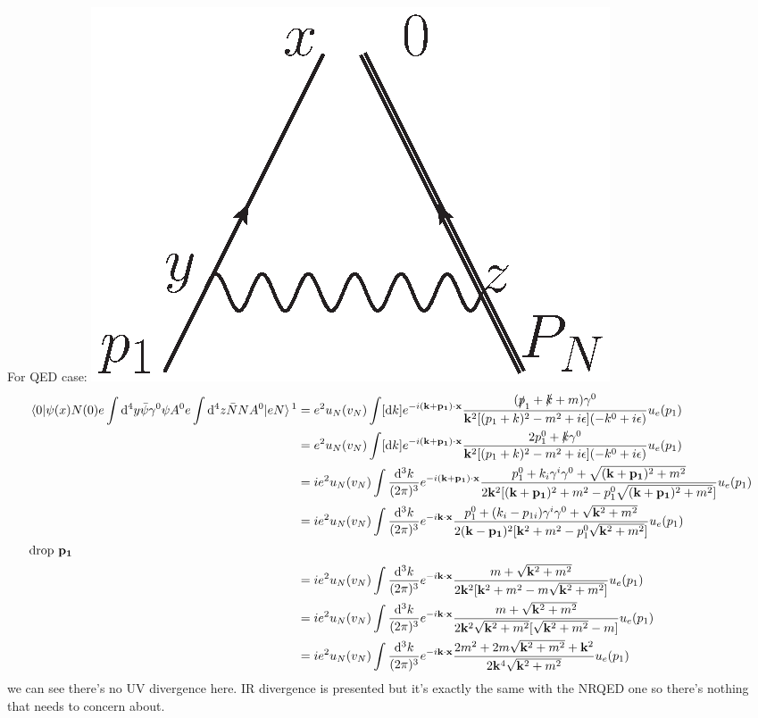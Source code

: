 \documentclass{article}
\newcommand{\g}{\gamma}
\begin{document}
For QED case:
\includegraphics[width=1.2 in]{OPE-2.eps}
\begin{align*}
  \mel{0}{\psi(x)N(0)e\int\dd^4y\bar\psi\g^0\psi A^0 e\int\dd^4 z \bar N NA^0}{eN}\text{\footnotemark}&=e^2u_N(v_N)\int[\dd k]e^{-i\vb{(k+p_1)}\cdot\vb{x}}\frac{(\slashed p_1+\slashed k+m)\g^0}{\vb{k}^2[(p_1+k)^2-m^2+i\epsilon](-k^0+i\epsilon)}u_e(p_1)\\
  &=e^2u_N(v_N)\int[\dd k]e^{-i\vb{(k+p_1)}\cdot\vb{x}}\frac{2p_1^0+\slashed k\g^0}{\vb{k}^2[(p_1+k)^2-m^2+i\epsilon](-k^0+i\epsilon)}u_e(p_1)\\
  &=ie^2u_N(v_N)\int\frac{\dd^3 k}{(2\pi)^3}e^{-i\vb{(k+p_1)}\cdot\vb{x}}\frac{p_1^0+k_i\g^i\g^0+\sqrt{(\vb{k}+\vb{p_1})^2+m^2}}{2\vb{k}^2[(\vb{k}+\vb{p_1})^2+m^2-p_1^0\sqrt{(\vb{k}+\vb{p_1})^2+m^2}]}u_e(p_1)\\
  &=ie^2u_N(v_N)\int\frac{\dd^3 k}{(2\pi)^3}e^{-i\vb{k}\cdot\vb{x}}\frac{p_1^0+(k_i-p_{1i})\g^i\g^0+\sqrt{\vb{k}^2+m^2}}{2(\vb{k}-\vb{p_1})^2[\vb{k}^2+m^2-p_1^0\sqrt{\vb{k}^2+m^2}]}u_e(p_1)\\
  \intertext{drop $\vb{p_1}$}
  &=ie^2u_N(v_N)\int\frac{\dd^3 k}{(2\pi)^3}e^{-i\vb{k}\cdot\vb{x}}\frac{m+\sqrt{\vb{k}^2+m^2}}{2\vb{k}^2[\vb{k}^2+m^2-m\sqrt{\vb{k}^2+m^2}]}u_e(p_1)\\
  &=ie^2u_N(v_N)\int\frac{\dd^3 k}{(2\pi)^3}e^{-i\vb{k}\cdot\vb{x}}\frac{m+\sqrt{\vb{k}^2+m^2}}{2\vb{k}^2\sqrt{\vb{k}^2+m^2}[\sqrt{\vb{k}^2+m^2}-m]}u_e(p_1)\\
  &=ie^2u_N(v_N)\int\frac{\dd^3 k}{(2\pi)^3}e^{-i\vb{k}\cdot\vb{x}}\frac{2m^2+2m\sqrt{\vb{k}^2+m^2}+\vb{k}^2}{2\vb{k}^4\sqrt{\vb{k}^2+m^2}}u_e(p_1)
\end{align*}%
we can see there's no UV divergence here. IR divergence is presented but it's exactly the same with the NRQED one so there's nothing that needs to concern about.
\end{document}

